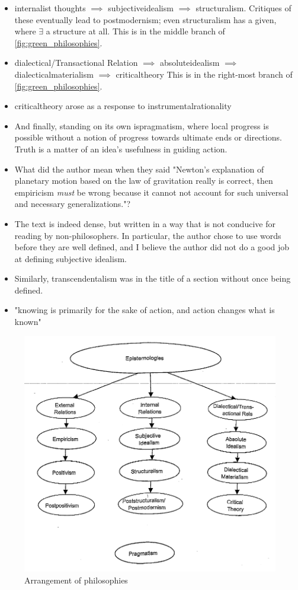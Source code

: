 \documentclass{TC}
\begin{document}
\begin{itemize}
		\item \Gls{internalist} thoughts $\implies$ \gls{subjectiveidealism} $\implies$ \gls{structuralism}. Critiques of these eventually lead to \gls{postmodernism}; even structuralism has a given, where $\exists$ a structure at all. This is in the middle branch of \autoref{fig:green_philosophies}.
		\item \Gls{dialectic}al/Transactional Relation $\implies$ \gls{absoluteidealism} $\implies$ \gls{dialecticalmaterialism} $\implies$ \gls{criticaltheory} This is in the right-most branch of \autoref{fig:green_philosophies}.
		\item \Gls{criticaltheory} arose as a response to \gls{instrumentalrationality}
		\item And finally, standing on its own is\gls{pragmatism}, where local progress is possible without a notion of progress towards ultimate ends or directions. Truth is a matter of an idea's usefulness in guiding action. 
	\end{itemize}
	
	\begin{itemize}[(???)]
		\item What did the author mean when they said "Newton's explanation of planetary motion based on the law of gravitation really is correct, then empiricism \emph{must} be wrong because it cannot not account for such universal and necessary generalizations."?
	\end{itemize}
	\begin{itemize}[(!!!)]
	\item The text is indeed dense, but written in a way that is not conducive for reading by non-philosophers. In particular, the author chose to use words before they are well defined, and I believe the author did not do a good job at defining subjective idealism. 
	
	\item Similarly, transcendentalism was in the title of a section without once being defined.
	\item "knowing is primarily for the sake of action, and action changes what is known"
	\end{itemize}

\begin{figure}[h]
\centering
\includegraphics[width=.7\textwidth]{bredo_philosophies.png}
\caption{Arrangement of philosophies \parencite{bredo_philosophies_2006}}
\label{fig:green_philosophies}
\end{figure}
	
	
\end{document}
